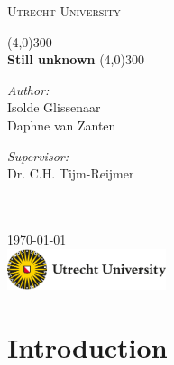 \documentclass[11pt]{report}
\begin{document}
\begin{titlepage}
	\begin{center}
	\vspace*{0\textheight}
	{\scshape\LARGE Utrecht University \par}
	\vspace{1cm} 
	\line(4,0){300}
	\vspace{0.5cm} \\
	{\Large \bfseries Still unknown}
	\vspace{0.5cm}
	\line(4,0){300} \\

	\vspace{2.5cm}
	\begin{minipage}[t]{0.4\textwidth}
	\begin{flushleft} \large
	\emph{Author:}\\
	{Isolde Glissenaar}\\
	{Daphne van Zanten} \\
	\end{flushleft}
	\end{minipage} %
	\begin{minipage}[t]{0.4\textwidth}
	\begin{flushright} \large
	\emph{Supervisor:} \\
	{Dr. C.H. Tijm-Reijmer}\\
	\end{flushright}
	\end{minipage}\\[0.4cm]

	\vspace{3.5cm}
	\large \textit{}\\[1cm]

	{\large {\today}\\[2cm] %

	\noindent
	\includegraphics[scale=1, width=0.35\textwidth]{UU-logo.jpg}}
	\end{center}
\end{titlepage}

\newpage
\tableofcontents

\chapter{Introduction}\label{sec:intro}
\setcounter{page}{2}
\end{document}
